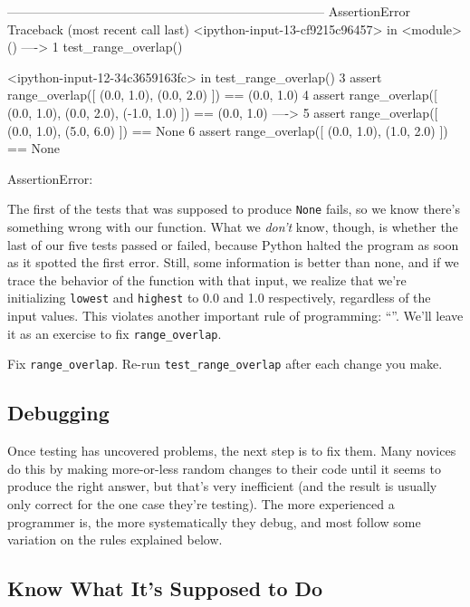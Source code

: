 \begin{VerbErr}
---------------------------------------------------------------------------
AssertionError                            Traceback (most recent call last)
<ipython-input-13-cf9215c96457> in <module>()
----> 1 test_range_overlap()

<ipython-input-12-34c3659163fc> in test_range_overlap()
      3     assert range_overlap([ (0.0, 1.0), (0.0, 2.0) ]) == (0.0, 1.0)
      4     assert range_overlap([ (0.0, 1.0), (0.0, 2.0), (-1.0, 1.0) ]) == (0.0, 1.0)
----> 5     assert range_overlap([ (0.0, 1.0), (5.0, 6.0) ]) == None
      6     assert range_overlap([ (0.0, 1.0), (1.0, 2.0) ]) == None

AssertionError: 
\end{VerbErr}

The first of the tests that was supposed to produce \texttt{None} fails,
so we know there's something wrong with our function. What we
\emph{don't} know, though, is whether the last of our five tests passed
or failed, because Python halted the program as soon as it spotted the
first error. Still, some information is better than none, and if we
trace the behavior of the function with that input, we realize that
we're initializing \texttt{lowest} and \texttt{highest} to 0.0 and 1.0
respectively, regardless of the input values. This violates another
important rule of programming:
``''. We'll leave it as an exercise to fix
\texttt{range\_overlap}.

\begin{challenge}
  Fix \texttt{range\_overlap}. Re-run \texttt{test\_range\_overlap}
  after each change you make.
\end{challenge}

\subsection{Debugging}

Once testing has uncovered problems, the next step is to fix them. Many
novices do this by making more-or-less random changes to their code
until it seems to produce the right answer, but that's very inefficient
(and the result is usually only correct for the one case they're
testing). The more experienced a programmer is, the more systematically
they debug, and most follow some variation on the rules explained below.

\subsection*{Know What It's Supposed to Do}

